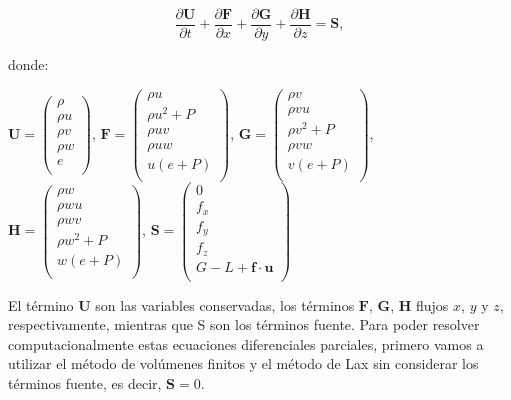 \documentclass[12pt,a4paper]{book}
\begin{document}
\begin{equation} \label{euler_cartesianas}
\dfrac{\partial \mathbf{U}}{\partial t}+\dfrac{\partial \mathbf{F}}{\partial x}+\dfrac{\partial \mathbf{G}}{\partial y}+\dfrac{\partial \mathbf{H}}{\partial z}= \mathbf{S}  ,
\end{equation}

\noindent donde:
\begin{center}


$\mathbf{U}=
\left(\begin{smallmatrix}
\rho \\
\rho u \\
\rho v \\
\rho w \\
e \\
\end{smallmatrix}\right)
$,
$\mathbf{F} =
\left(\begin{smallmatrix}
\rho u \\
\rho u^{2}+P \\
\rho uv \\
\rho uw \\
u(e+P) \\
\end{smallmatrix}\right)
$,
$\mathbf{G} =
\left(\begin{smallmatrix}
\rho v\\
\rho vu \\
\rho v^{2}+P \\
\rho vw \\
v(e+P) \\
\end{smallmatrix}\right)
$,
$\mathbf{H} =
\left(\begin{smallmatrix}
\rho w\\
\rho wu \\
\rho wv \\
\rho w^{2}+P \\
w(e+P) \\
\end{smallmatrix}\right)
$, 
$\mathbf{S} =
\left(\begin{smallmatrix}
0 \\
f_{x} \\
f_{y} \\
f_{z} \\
G-L+\textbf{f} \cdot \textbf{u} \\
\end{smallmatrix}\right)
$
\end{center}

El término $\mathbf{U}$ son las variables conservadas, los términos $\mathbf{F}$, $\mathbf{G}$, $\mathbf{H}$ flujos $x$, $y$ y $z$, respectivamente, mientras que S son los términos fuente. 
Para poder resolver computacionalmente estas ecuaciones diferenciales parciales, primero vamos a utilizar el método de volúmenes finitos y el método de Lax sin considerar los términos fuente, es decir, 
$\mathbf{S}=0$.
\end{document}
